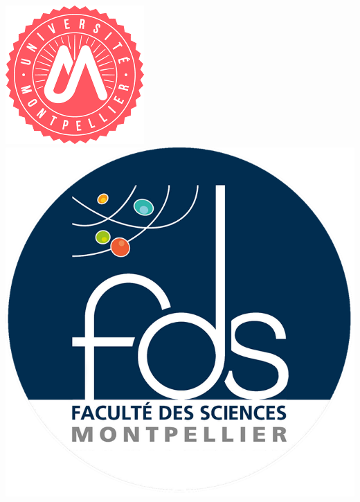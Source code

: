 \documentclass[frenchb]{report}
\newcommand{\1}{\mathbbm{1}}
\theoremstyle{definition}\newtheorem{defn}{Définition}
\theoremstyle{definition}\newtheorem{exm}{Exemple}
\theoremstyle{definition}\newtheorem{nota}{Notation}
\theoremstyle{definition}\newtheorem{rem}{Remarque}
\begin{document}
\def\appendixpage{\vspace*{8cm}
\begin{center}
\Huge\textbf{Annexes}
\end{center}
}
\def\appendixname{Annexe}%

\begin{titlepage}
\begin{center}
\includegraphics[scale=0.6]{images/logo.png}
\hfill
\includegraphics[scale=0.35]{images/fds_logo.png}
\hfill

\end{center}
\end{titlepage}
\end{document}
